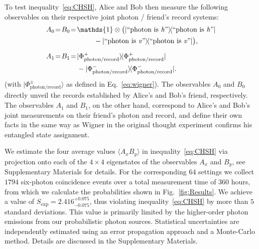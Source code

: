 \documentclass[aps,floatfix,superscriptaddress,twocolumn,tightenlines,amsmath,amssymb,nofootinbib,10pt]{revtex4-1}
\newcommand{\ket}[1] {| #1 \rangle}
\newcommand{\ketbra}[1]{ | #1 \rangle\!\langle #1 |}
\newcommand{\id}{\mathds{1}}
\begin{document}
To test inequality~\eqref{eq:CHSH}, Alice and Bob then measure the following observables on their respective joint photon / friend's record systems:
\begin{align}
A_0 \!=\! B_0 & \!=\! \id \otimes \big(\ketbra{\text{``photon is \textit{h}''}} \notag \\
& \hspace{12mm} - \ketbra{\text{``photon is \textit{v}''}}\big), \notag \\[2mm]
A_1 \!=\! B_1 & \!=\! \ketbra{\Phi^+_{\text{photon/record}}} \notag \\
& \quad - \ketbra{\Phi^-_{\text{photon/record}}}.
\label{Eq:Observables}
\end{align}
(with $\ket{\Phi^\pm_{\text{photon/record}}}$ as defined in Eq.~\eqref{eq:wigner}). The observables $A_0$ and $B_0$ directly unveil the records established by Alice's and Bob's friend, respectively. The observables $A_1$ and $B_1$, on the other hand, correspond to Alice's and Bob's joint measurements on their friend's photon and record, and define their own facts in the same way as Wigner in the original thought experiment confirms his entangled state assignment.

We estimate the four average values $\langle A_x B_y \rangle$ in inequality~\eqref{eq:CHSH} via projection onto each of the $4 \times 4$ eigenstates of the observables $A_x$ and $B_y$, see Supplementary Materials for details. For the corresponding 64 settings we collect $1794$ six-photon coincidence events over a total measurement time of 360 hours, from which we calculate the probabilities shown in Fig.~\ref{fig:Results}.
We achieve a value of $S_{\textrm{exp}} = 2.416^{+0.075}_{-0.075}$, thus violating inequality~\eqref{eq:CHSH} by more than $5$ standard deviations. This value is primarily limited by the higher-order photon emissions from our probabilistic photon sources. Statistical uncertainties are independently estimated using an error propagation approach and a Monte-Carlo method. Details are discussed in the Supplementary Materials. 

\end{document}
